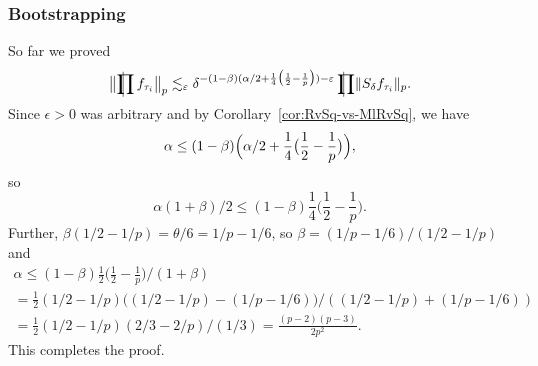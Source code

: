 \subsubsection{Bootstrapping}
So far we proved
\[
\norm[\big]{ \avprod f_{\tau_i} }_{p}
\lesssim_\epsilon
\delta^{- (1-\beta) (\alpha/2 + \frac{1}{4} \big( \frac{1}{2} - \frac{1}{p} \big)) - \epsilon} \avprod \norm{S_{\delta} f_{\tau_i} }_p.
\]
Since $\epsilon>0$ was arbitrary and by Corollary~\ref{cor:RvSq-vs-MlRvSq}, we have
\[
\alpha \le (1-\beta) \Bigl( \alpha/2 + \frac{1}{4} \bigl( \frac{1}{2} - \frac{1}{p} \bigr) \Bigr),
\]
so
\[
\alpha(1+\beta)/2
\le
(1-\beta) \frac{1}{4} \big( \frac{1}{2} - \frac{1}{p} \big).
\]
Further, $\beta (1/2-1/p) = \theta/6 = 1/p-1/6$, so $\beta = (1/p-1/6)/(1/2-1/p)$ and
\begin{multline*}
\alpha
\le
(1-\beta) \frac{1}{2} \big( \frac{1}{2} - \frac{1}{p} \big) / (1+\beta) \\
=
\frac{1}{2} (1/2-1/p) \big( (1/2-1/p) - (1/p-1/6) \big) / ((1/2-1/p) + (1/p-1/6))\\
=
\frac{1}{2} (1/2-1/p) ( 2/3 - 2/p ) / (1/3)
=
\frac{(p-2) ( p - 3 )}{2 p^{2}}.
\end{multline*}
This completes the proof.
